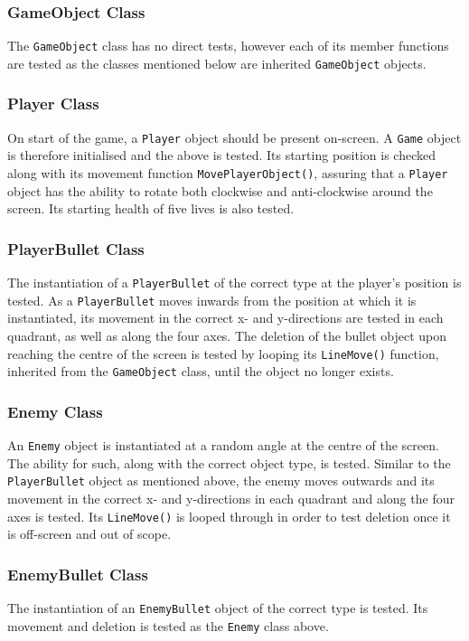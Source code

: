 \documentclass[10pt,twocolumn]{witseiepaper}
\begin{document}
\subsubsection{GameObject Class}
The \texttt{GameObject} class has no direct tests, however each of its member functions are tested as the classes mentioned below are inherited \texttt{GameObject} objects.
\subsubsection{Player Class}
On start of the game, a \texttt{Player} object should be present on-screen. A \texttt{Game} object is therefore initialised and the above is tested. Its starting position is checked along with its movement function \texttt{MovePlayerObject()}, assuring that a \texttt{Player} object has the ability to rotate both clockwise and anti-clockwise around the screen. Its starting health of five lives is also tested. 
\subsubsection{PlayerBullet Class}
The instantiation of a \texttt{PlayerBullet} of the correct type at the player's position is tested. As a \texttt{PlayerBullet} moves inwards from the position at which it is instantiated, its movement in the correct x- and y-directions are tested in each quadrant, as well as along the four axes. The deletion of the bullet object upon reaching the centre of the screen is tested by looping its \texttt{LineMove()} function, inherited from the \texttt{GameObject} class, until the object no longer exists.
\subsubsection{Enemy Class}
An \texttt{Enemy} object is instantiated at a random angle at the centre of the screen. The ability for such, along with the correct object type, is tested. Similar to the \texttt{PlayerBullet} object as mentioned above, the enemy moves outwards and its movement in the correct x- and y-directions in each quadrant and along the four axes is tested. Its \texttt{LineMove()} is looped through in order to test deletion once it is off-screen and out of scope.
\subsubsection{EnemyBullet Class}
The instantiation of an \texttt{EnemyBullet} object of the correct type is tested. Its movement and deletion is tested as the \texttt{Enemy} class above.
\end{document}
